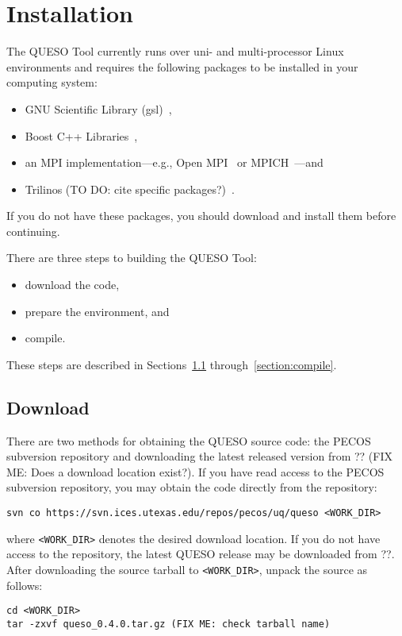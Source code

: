 \chapter{Installation}\label{ch-install}
\thispagestyle{headings}

The QUESO Tool currently runs over uni- and multi-processor Linux
environments and requires the following packages to be installed in
your computing system:
%
\begin{itemize}
\item GNU Scientific Library (gsl)~\cite{gsl},
\item Boost C++ Libraries~\cite{boost}, 
\item an MPI implementation---e.g., Open MPI~\cite{openmpi} or MPICH~\cite{mpich}---and
\item Trilinos (TO DO: cite specific packages?)~\cite{trilinos}.
\end{itemize}
%
If you do not have these packages, you should download and install
them before continuing.

There are three steps to building the QUESO Tool:
%
\begin{itemize}
\item download the code,
\item prepare the environment, and
\item compile.
\end{itemize}
%
These steps are described in Sections~\ref{section:download}
through~\ref{section:compile}.

\section{Download} \label{section:download}
There are two methods for obtaining the QUESO source code: the PECOS
subversion repository and downloading the latest released version from
?? (FIX ME: Does a download location exist?).  If you have read access
to the PECOS subversion repository, you may obtain the code directly
from the repository:
%
\begin{verbatim}
svn co https://svn.ices.utexas.edu/repos/pecos/uq/queso <WORK_DIR>
\end{verbatim}
%
where \verb+<WORK_DIR>+ denotes the desired download location.  If you
do not have access to the repository, the latest QUESO release may be
downloaded from ??.  After
downloading the source tarball to \verb+<WORK_DIR>+, unpack the source
as follows:
%
\begin{verbatim}
cd <WORK_DIR>
tar -zxvf queso_0.4.0.tar.gz (FIX ME: check tarball name)
\end{verbatim}
%

